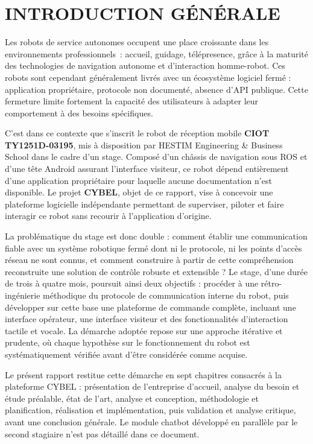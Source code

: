 \section*{\centering INTRODUCTION GÉNÉRALE}

\indent Les robots de service autonomes occupent une place croissante dans les environnements professionnels~: accueil, guidage, télépresence, grâce à la maturité des technologies de navigation autonome et d'interaction homme-robot. Ces robots sont cependant généralement livrés avec un écosystème logiciel fermé : application propriétaire, protocole non documenté, absence d'API publique. Cette fermeture limite fortement la capacité des utilisateurs à adapter leur comportement à des besoins spécifiques.

C'est dans ce contexte que s'inscrit le robot de réception mobile \textbf{CIOT TY1251D-03195}, mis à disposition par HESTIM Engineering \& Business School dans le cadre d'un stage. Composé d'un châssis de navigation sous ROS et d'une tête Android assurant l'interface visiteur, ce robot dépend entièrement d'une application propriétaire pour laquelle aucune documentation n'est disponible. Le projet \textbf{CYBEL}, objet de ce rapport, vise à concevoir une plateforme logicielle indépendante permettant de superviser, piloter et faire interagir ce robot sans recourir à l'application d'origine.

La problématique du stage est donc double : comment établir une communication fiable avec un système robotique fermé dont ni le protocole, ni les points d'accès réseau ne sont connus, et comment construire à partir de cette compréhension reconstruite une solution de contrôle robuste et extensible ? Le stage, d'une durée de trois à quatre mois, poursuit ainsi deux objectifs : procéder à une rétro-ingénierie méthodique du protocole de communication interne du robot, puis développer sur cette base une plateforme de commande complète, incluant une interface opérateur, une interface visiteur et des fonctionnalités d'interaction tactile et vocale. La démarche adoptée repose sur une approche itérative et prudente, où chaque hypothèse sur le fonctionnement du robot est systématiquement vérifiée avant d'être considérée comme acquise.

Le présent rapport restitue cette démarche en sept chapitres consacrés à la
plateforme CYBEL : présentation de l'entreprise d'accueil, analyse du besoin
et étude préalable, état de l'art, analyse et conception, méthodologie et
planification, réalisation et implémentation, puis validation et analyse
critique, avant une conclusion générale. Le module chatbot développé en
parallèle par le second stagiaire n'est pas détaillé dans ce document.
